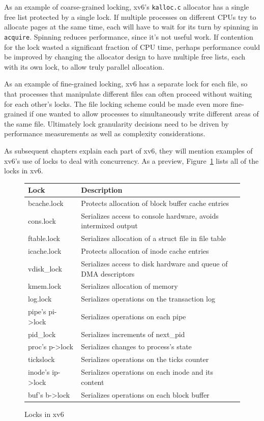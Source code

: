 As an example of coarse-grained locking, xv6's \lstinline{kalloc.c}
allocator has a single free list protected by a single lock. If
multiple processes on different CPUs try to allocate pages at the same
time, each will have to wait for its turn by spinning in {\tt
  acquire}. Spinning reduces performance, since it's not useful work.
If contention for the lock wasted a significant fraction of CPU time,
perhaps performance could be improved by changing the allocator design
to have multiple free lists, each with its own lock, to allow truly
parallel allocation.

As an example of fine-grained locking, xv6 has a separate lock for
each file, so that processes that manipulate different files can often
proceed without waiting for each other's locks. The file locking
scheme could be made even more fine-grained if one wanted to allow
processes to simultaneously write different areas of the same file.
Ultimately lock granularity decisions need to be driven by performance
measurements as well as complexity considerations.

As subsequent chapters explain each part of xv6, they
will mention examples of xv6's use of locks
to deal with concurrency.
As a preview,
Figure~\ref{fig:locktable}
lists all of the locks in xv6.

\begin{figure}[t]
\center
\begin{tabular}{ll}
{\bf Lock} & {\bf Description} \\
\midrule
bcache.lock & Protects allocation of block buffer cache entries \\
cons.lock & Serializes access to console hardware, avoids intermixed output \\
ftable.lock & Serializes allocation of a struct file in file table \\
icache.lock & Protects allocation of inode cache entries \\
vdisk\_lock & Serializes access to disk hardware and queue of DMA descriptors \\
kmem.lock & Serializes allocation of memory \\
log.lock & Serializes operations on the transaction log \\
pipe's pi->lock & Serializes operations on each pipe \\
pid\_lock & Serializes increments of next\_pid \\
proc's p->lock & Serializes changes to process's state \\
tickslock & Serializes operations on the ticks counter \\
inode's ip->lock & Serializes operations on each inode and its content \\
buf's b->lock & Serializes operations on each block buffer \\
\end{tabular}
\caption{Locks in xv6}
\label{fig:locktable}
\end{figure}

